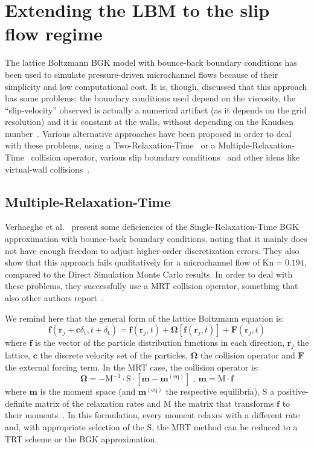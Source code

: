 \section{Extending the LBM to the slip flow regime}
The lattice Boltzmann BGK model with bounce-back boundary conditions has been
used to simulate pressure-driven microchannel flows because of their simplicity
and low computational cost. It is, though, discussed that this approach has some
problems: the boundary conditions used depend on the viscosity, the ``slip-velocity''
observed is actually a numerical artifact (as it depends on the grid resolution)
and it is constant at the walls, without
depending on the Knudsen number~\cite{Verhaeghe2009}. Various alternative
approaches have been proposed in order to deal with these problems, using a
Two-Relaxation-Time~\cite{Norouzi2015} or a Multiple-Relaxation-Time~\cite{Verhaeghe2009} collision operator, various slip
boundary conditions~\cite{Zhang2012} and other ideas like virtual-wall collisions~\cite{Toschi2005}.

\subsection{Multiple-Relaxation-Time}
Verhaeghe et al.~\cite{Verhaeghe2009} present some deficiencies of the Single-Relaxation-Time BGK approximation
with bounce-back boundary conditions, noting that it mainly does not have enough
freedom to adjust higher-order discretization errors. They
also show that this approach fails qualitatively for a 
microchannel flow of $\mathrm{Kn}=0.194$, compared to the Direct Simulation Monte Carlo results.
In order to deal with these problems, they successfully use a MRT collision operator,
something that also other authors report~\cite{Li2011, Neumann2012, Norouzi2015}.

We remind here that the general form of the lattice Boltzmann equation is:
\begin{equation}
 \mathbf{f}(\mathbf{r}_j + \mathbf{c}\delta_\mathrm{t}, t+\delta_\mathrm{t}) = \mathbf{f}(\mathbf{r}_j, t) + \mathbf{\Omega}[\mathbf{f}(\mathbf{r}_j, t)] + \mathbf{F}(\mathbf{r}_j, t)
\end{equation}
where $\mathbf{f}$ is the vector of the particle distribution functions in each direction, $\mathbf{r}_j$ the lattice,
$\mathbf{c}$ the discrete velocity set of the particles, $\mathbf{\Omega}$ the collision operator
and $\mathbf{F}$ the external forcing term. In the MRT case, the collision operator
is:
\begin{equation}
 \mathbf{\Omega} = - \mathrm{M}^{-1} \cdot \mathrm{S} \cdot [\mathbf{m} - \mathbf{m}^\mathrm{(eq)}] 
 \textrm{ , \ }
 \mathbf{m} = \mathrm{M} \cdot \mathbf{f}
\end{equation}
where $\mathbf{m}$ is the moment space (and $\mathbf{m}^\mathrm{(eq)}$ the respective equilibria), $\mathrm{S}$ a positive-definite matrix of
the relaxation rates and $\mathrm{M}$ the matrix that transforms $\mathbf{f}$ to
their moments~\cite{Verhaeghe2009}.
In this formulation, every moment relaxes with a different rate and, 
with appropriate selection of the $\mathrm{S}$, the MRT method can be reduced to a TRT scheme
or the BGK approximation.


